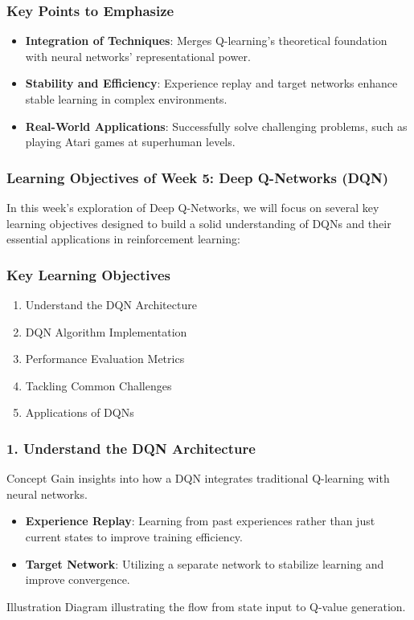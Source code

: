 \documentclass{beamer}
\begin{document}
\begin{frame}[fragile]
    \frametitle{Key Points to Emphasize}
    \begin{itemize}
        \item \textbf{Integration of Techniques}: Merges Q-learning's theoretical foundation with neural networks' representational power.
        \item \textbf{Stability and Efficiency}: Experience replay and target networks enhance stable learning in complex environments.
        \item \textbf{Real-World Applications}: Successfully solve challenging problems, such as playing Atari games at superhuman levels.
    \end{itemize}
\end{frame}

\begin{frame}[fragile]
    \frametitle{Learning Objectives of Week 5: Deep Q-Networks (DQN)}
    In this week’s exploration of Deep Q-Networks, we will focus on several key learning objectives designed to build a solid understanding of DQNs and their essential applications in reinforcement learning:
\end{frame}

\begin{frame}[fragile]
    \frametitle{Key Learning Objectives}
    \begin{enumerate}
        \item Understand the DQN Architecture
        \item DQN Algorithm Implementation
        \item Performance Evaluation Metrics
        \item Tackling Common Challenges
        \item Applications of DQNs
    \end{enumerate}
\end{frame}

\begin{frame}[fragile]
    \frametitle{1. Understand the DQN Architecture}
    \begin{block}{Concept}
        Gain insights into how a DQN integrates traditional Q-learning with neural networks.
    \end{block}
    \begin{itemize}
        \item \textbf{Experience Replay}: Learning from past experiences rather than just current states to improve training efficiency.
        \item \textbf{Target Network}: Utilizing a separate network to stabilize learning and improve convergence.
    \end{itemize}
    \begin{block}{Illustration}
        Diagram illustrating the flow from state input to Q-value generation.
    \end{block}
\end{frame}
\end{document}
